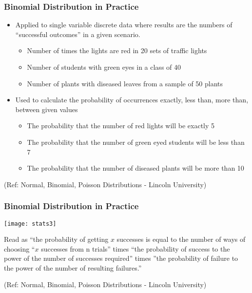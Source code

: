 \begin{frame}
\frametitle{Binomial Distribution in Practice}

\begin{itemize}
\item Applied to single variable discrete data where results are the numbers of
``successful outcomes'' in a given scenario. 
\begin{itemize}
\item Number of times the lights are red in 20 sets of traffic lights
\item Number of students with green eyes in a class of 40
\item Number of plants with diseased leaves from a sample of 50 plants
\end{itemize}
\item Used to calculate the probability of occurrences exactly, less than, more than,
between given values
\begin{itemize}
\item The probability that the number of red lights will be exactly 5
\item The probability that the number of green eyed students will be less than 7
\item The probability that the number of diseased plants will be more than 10
\end{itemize}
\end{itemize}


{\tiny (Ref: Normal, Binomial, Poisson Distributions -  Lincoln University)}
\end{frame}


\begin{frame}
\frametitle{Binomial Distribution in Practice}

\begin{center}
\texttt{[image: stats3]}
\end{center}

Read as “the probability of getting $x$ successes is equal to the number of ways of choosing ``$x$  successes from n trials'' times ``the probability of success to
the power of the number of successes required'' times ''the probability of failure to
the power of the number of resulting failures.''


{\tiny (Ref: Normal, Binomial, Poisson Distributions -  Lincoln University)}
\end{frame}


